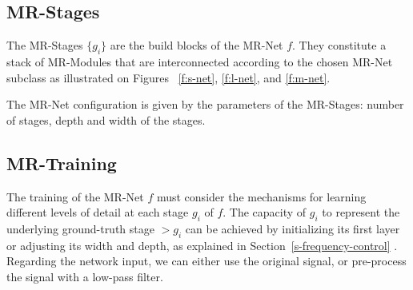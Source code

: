 

\subsection{MR-Stages}\label{sec:mr_stages}

The MR-Stages $\{g_i\}$ are the build blocks of the MR-Net $f$. They constitute a stack of MR-Modules that are interconnected according to the chosen MR-Net subclass as illustrated on Figures ~\ref{f:s-net}, \ref{f:l-net}, and \ref{f:m-net}.


The MR-Net configuration is given by the 
parameters of the MR-Stages: number of stages, depth and width of the stages.


\subsection{MR-Training}\label{sec:mr_training}
\label{s:training}

The training of the MR-Net $f$ must consider the mechanisms for learning different levels of detail at each stage $g_i$ of $f$. 
The capacity of $g_i$ to represent the underlying ground-truth stage  $\gt{g}_i$ can be achieved by initializing its first layer or adjusting its width and depth, as explained in Section~\ref{s-frequency-control}
.
Regarding the network input, we can either use the original signal, or pre-process the signal with a low-pass filter.


